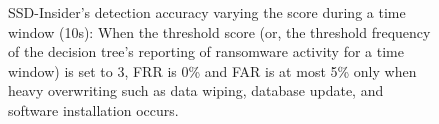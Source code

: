 \documentclass[conference]{IEEEtran}
\newcommand{\ours}{SSD-Insider}
\begin{document}
\begin{figure}[t]
        \caption{\ours{}'s detection accuracy varying the score during a time window (10s):
        When the threshold score (or, the threshold frequency of the decision tree's reporting of ransomware activity 
        for a time window) is set to 3, FRR is 0\% and FAR is at most 5\% 
        only when heavy overwriting such as data wiping, database update, and software installation occurs.}
        \label{fig:accuracy}
\end{figure}
\end{document}
